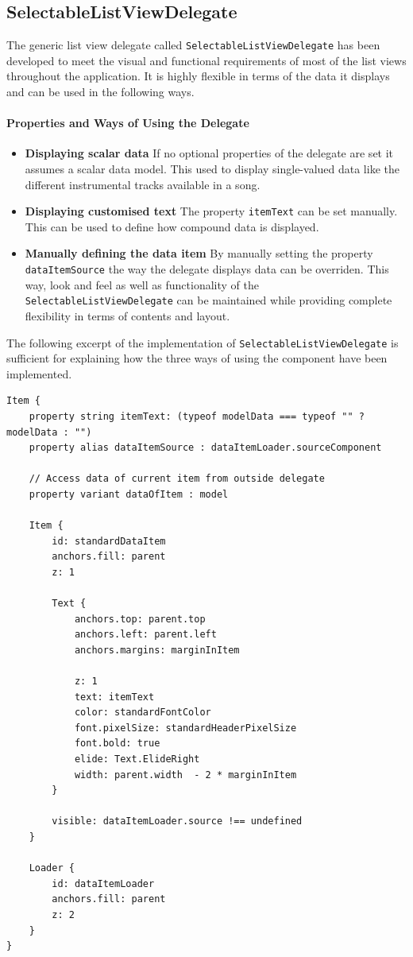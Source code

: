\subsection{SelectableListViewDelegate}
The generic list view delegate called {\tt SelectableListViewDelegate} has been developed to meet the visual and functional requirements of most of the list views throughout the application. It is highly flexible in terms of the data it displays and can be used in the following ways.
\paragraph{Properties and Ways of Using the Delegate}
\begin {itemize}
	\item {
		\textbf{Displaying scalar data}
		If no optional properties of the delegate are set it assumes a scalar data model. This used to display single-valued data like the different instrumental tracks available in a song.
	}
	\item {
		\textbf{Displaying customised text}
		The property {\tt itemText} can be set manually. This can be used to define how compound data is displayed.
	}
	\item {
		\textbf{Manually defining the data item}
		By manually setting the property {\tt dataItemSource} the way the delegate displays data can be overriden. This way, look and feel as well as functionality of the {\tt SelectableListViewDelegate} can be maintained while providing complete flexibility in terms of contents and layout.
	}
\end {itemize}
The following excerpt of the implementation of {\tt SelectableListViewDelegate} is sufficient for explaining how the three ways of using the component have been implemented.
\begin{lstlisting}
Item {
    property string itemText: (typeof modelData === typeof "" ? modelData : "")
    property alias dataItemSource : dataItemLoader.sourceComponent

    // Access data of current item from outside delegate
    property variant dataOfItem : model

    Item {
        id: standardDataItem
        anchors.fill: parent
        z: 1

        Text {
            anchors.top: parent.top
            anchors.left: parent.left
            anchors.margins: marginInItem

            z: 1
            text: itemText
            color: standardFontColor
            font.pixelSize: standardHeaderPixelSize
            font.bold: true
            elide: Text.ElideRight
            width: parent.width  - 2 * marginInItem
        }

        visible: dataItemLoader.source !== undefined
    }

    Loader {
        id: dataItemLoader
        anchors.fill: parent
        z: 2
    }
}
\end{lstlisting}
